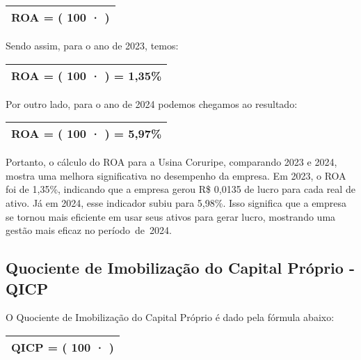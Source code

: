 \documentclass[1pt,a4paper]{article}
\begin{document}
		\begin{center}
			\begin{tabular}{|c|}
				\hline
				ROA = \left( 100 · \left[ \frac{LUCRO \, LIQUIDO}{ATIVO \, TOTAL} \right] \right)  \\
				\hline
			\end{tabular}
		\end{center}
		Sendo assim, para o ano de 2023, temos:
		\begin{center}
			\begin{tabular}{|c|}
				\hline
				ROA = \left( 100 · \left[ \frac{140.419}{10.400.403} \right] \right) = 1,35\% \\
				\hline
			\end{tabular}
		\end{center}
		Por outro lado, para o ano de 2024 podemos chegamos ao resultado: 
			\begin{center}
				\begin{tabular}{|c|}
					\hline
					ROA = \left( 100 · \left[ \frac{650.143}{10.878.562} \right] \right) = 5,97\% \\
					\hline
				\end{tabular}
			\end{center}
			
		Portanto, o cálculo do ROA para a Usina Coruripe, comparando 2023 e 2024, mostra uma melhora significativa no desempenho da empresa. Em 2023, o ROA foi de 1,35\%, indicando que a empresa gerou R\$ 0,0135 de lucro para cada real de ativo. Já em 2024, esse indicador subiu para 5,98\%. Isso significa que a empresa se tornou mais eficiente em usar seus ativos para gerar lucro, mostrando uma gestão mais eficaz no período de 2024.
		
	
	
	
	\subsection{Quociente de Imobilização do Capital Próprio - QICP}
	
	\hspace*{1.5cm} O Quociente de Imobilização do Capital Próprio é dado pela fórmula abaixo:
		\begin{center}
			\begin{tabular}{|c|}
				\hline
				QICP = \left( 100 · \left[ \frac{IMOBILIZADO}{PATRIMÔNIO LÍQUIDO} \right] \right)  \\
				\hline
			\end{tabular}
		\end{center}
		
\end{document}
